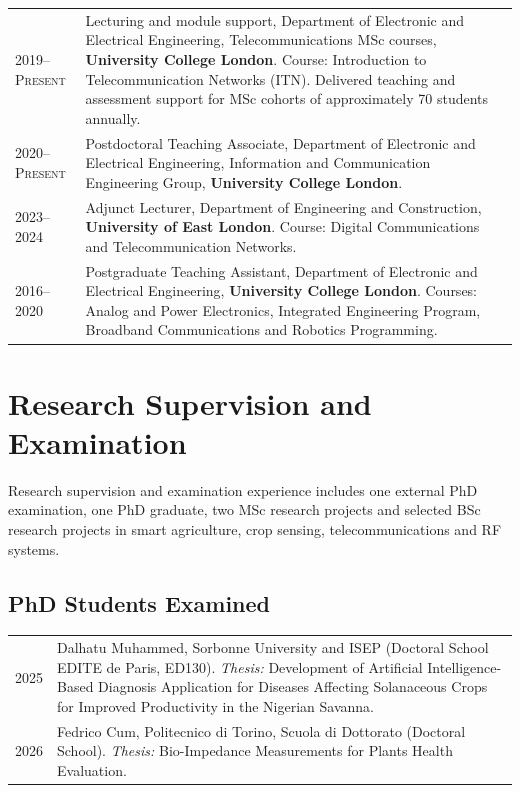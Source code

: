 \documentclass[a4paper,11pt]{article}
\newcommand{\cvitem}[2]{%
    \textsc{#1} & #2\\[2.5mm]
}
\begin{document}
\begin{tabularx}{\textwidth}{>{\raggedleft\arraybackslash}p{2.4cm} X}

\cvitem{2019--Present}{
Lecturing and module support, Department of Electronic and Electrical Engineering,
Telecommunications MSc courses, \textbf{University College London}.
Course: Introduction to Telecommunication Networks (ITN).
Delivered teaching and assessment support for MSc cohorts of approximately 70 students annually.
}

\cvitem{2020--Present}{
Postdoctoral Teaching Associate, Department of Electronic and Electrical Engineering,
Information and Communication Engineering Group,
\textbf{University College London}.
}

\cvitem{2023--2024}{
Adjunct Lecturer, Department of Engineering and Construction,
\textbf{University of East London}.
Course: Digital Communications and Telecommunication Networks.
}

\cvitem{2016--2020}{
Postgraduate Teaching Assistant, Department of Electronic and Electrical Engineering,
\textbf{University College London}.
Courses: Analog and Power Electronics, Integrated Engineering Program,
Broadband Communications and Robotics Programming.
}

\end{tabularx}


\section{Research Supervision and Examination}

Research supervision and examination experience includes one external PhD examination, one PhD graduate, two MSc research projects and selected BSc research projects in smart agriculture, crop sensing, telecommunications and RF systems.

\subsection*{PhD Students Examined}

\begin{tabularx}{\textwidth}{>{\raggedleft\arraybackslash}p{2.4cm} X}

\cvitem{2025}{
Dalhatu Muhammed, Sorbonne University and ISEP
(Doctoral School EDITE de Paris, ED130).
\emph{Thesis:} Development of Artificial Intelligence-Based Diagnosis Application for Diseases Affecting Solanaceous Crops for Improved Productivity in the Nigerian Savanna.
}

\cvitem{2026}{
Fedrico Cum, Politecnico di Torino, Scuola di Dottorato (Doctoral School).
\emph{Thesis:} Bio-Impedance Measurements for Plants Health Evaluation.
}

\end{tabularx}
\end{document}
